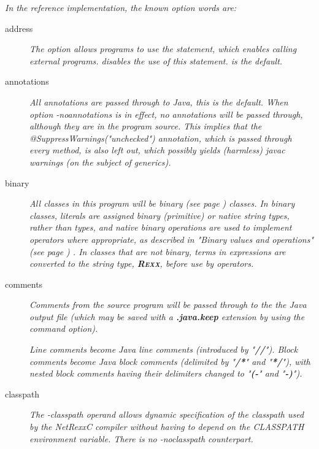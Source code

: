 \emph{In the reference implementation, the known option words are:}
\begin{description}
\item[address]
\emph{The  option allows programs to use the 
  statement, which enables calling external programs. 
  disables the use of this statement.  is the default.} 

\item[annotations]
\emph{All annotations are passed through to Java, this is the
  default. When option -noannotations is in effect, no annotations
  will be passed through, although they are in the program
  source. This implies that the @SuppressWarnings("unchecked")
  annotation, which is passed through every method, is also left out,
  which possibly yields (harmless) javac warnings (on the subject of generics).}

\item[binary]
\emph{All classes in this program will be  binary (see page \pageref{refbincla}) 
classes.
In binary classes, literals are assigned binary (primitive) or native
string types, rather than \nr{} types, and native binary operations
are used to implement operators where appropriate, as described in
 "\emph{Binary values and operations}" (see page \pageref{refbinary}) .
In classes that are not binary, terms in expressions are converted to
the \nr{} string type, \textbf{R\textsc{exx}}, before use by operators.}

\item[comments]

\emph{Comments from the \nr{} source program will be passed through to the
the Java output file (which may be saved with a \textbf{.java.keep}
extension by using the  command option).}
 
\emph{Line comments become Java line comments (introduced by
"\textbf{//}").
Block comments become Java block comments (delimited by
"\textbf{/*}" and "\textbf{*/}"), with nested block
comments having their delimiters changed to "\textbf{(-}" and
"\textbf{-)}").}

\item[classpath]
\emph{The \emph{-classpath} operand allows dynamic specification of the
  classpath used by the NetRexxC compiler without having to depend on
  the CLASSPATH environment variable. There is no -noclasspath counterpart.}


\end{description}
